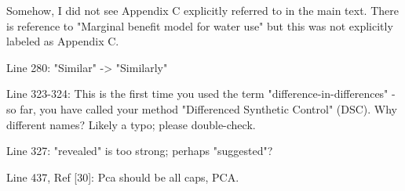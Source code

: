 \RC{} Somehow, I did not see Appendix C explicitly referred to in the main text. There is reference to "Marginal benefit model for water use" but this was not explicitly labeled as Appendix C.

\RC{} Line 280: "Similar" -> "Similarly"

\RC{} Line 323-324: This is the first time you used the term "difference-in-differences" - so far, you have called your method "Differenced Synthetic Control" (DSC). Why different names? Likely a typo; please double-check.

\RC{} Line 327: "revealed" is too strong; perhaps "suggested"?

\RC{} Line 437, Ref [30]: Pca should be all caps, PCA.\

